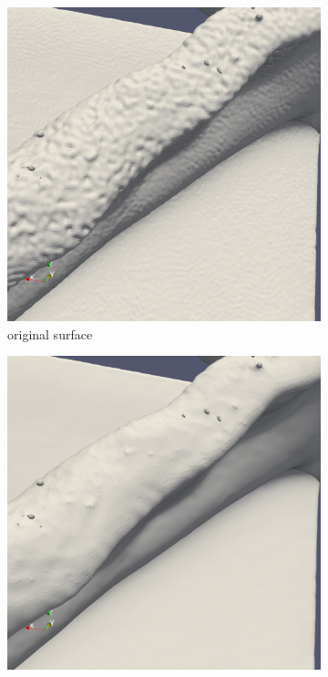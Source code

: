 \begin{figure}
	\begin{center}
		\begin{subfigure}[b]{0.47\textwidth}
			\includegraphics[width=\textwidth]{figures/DDMOriginal3.png}
			\caption{original surface}
		\end{subfigure}
		\begin{subfigure}[b]{0.47\textwidth}
			\includegraphics[width=\textwidth]{figures/DDMMls3.png}

\end{subfigure}
\end{center}
\end{figure}
